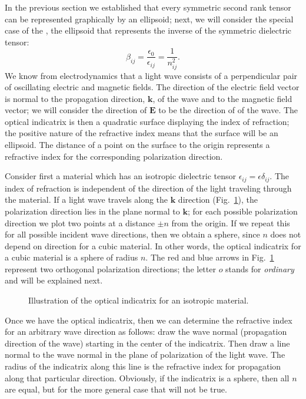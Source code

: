 In the previous section we established that every symmetric second rank tensor can be represented graphically by an ellipsoid; next, we will consider the special case of the , the ellipsoid that represents the inverse of the symmetric dielectric tensor:
\begin{equation}
	\beta_{ij} = \frac{\epsilon_0}{\epsilon_{ij}} = \frac{1}{n^2_{ij}}.
\end{equation}
We know from electrodynamics that a light wave consists of a perpendicular pair of oscillating electric and magnetic fields.  The direction of the electric field vector is normal to the propagation direction, $\mathbf{k}$, of the wave and to the magnetic field vector; we will consider the direction of $\mathbf{E}$ to be the direction of  of the wave.  The optical indicatrix is then a quadratic surface displaying the index of refraction; the positive nature of the refractive index means that the surface will be an ellipsoid.  The distance of a point on the surface to the origin represents a refractive index for the corresponding polarization direction.  

Consider first a  material which has an isotropic dielectric tensor $\epsilon_{ij} = \epsilon\delta_{ij}$.  The index of refraction is independent of the direction of the light traveling through the material.  If a light wave travels along the $\mathbf{k}$ direction (Fig.~\ref{\chabbr:fig:indicatrix}), the polarization direction lies in the plane normal to $\mathbf{k}$; for each possible polarization direction we plot two points at a distance $\pm n$ from the origin.  If we repeat this for all possible incident wave directions, then we obtain a sphere, since $n$ does not depend on direction for a cubic material.  In other words, the optical indicatrix for a cubic material is a sphere of radius $n$.  The red and blue arrows in Fig.~\ref{\chabbr:fig:indicatrix} represent two orthogonal polarization directions; the letter $o$ stands for \textit{ordinary} and will be explained next.

\begin{figure}[h]
\centering\leavevmode
\caption{Illustration of the optical indicatrix for an isotropic material.}
\label{\chabbr:fig:indicatrix}
\end{figure}


Once we have the optical indicatrix, then we can determine the refractive index for an arbitrary wave direction as follows: draw the wave normal (propagation direction of the wave) starting in the center of the indicatrix.  Then draw a line normal to the wave normal in the plane of polarization of the light wave.  The radius of the indicatrix along this line is the refractive index for propagation along that particular direction.  Obviously, if the indicatrix is a sphere, then all $n$ are equal, but for the more general case that will not be true.  

